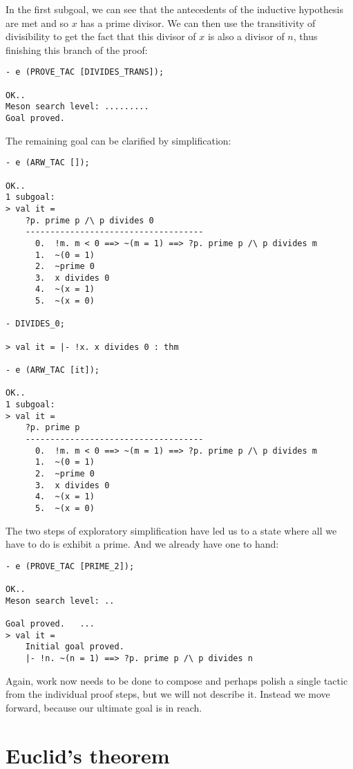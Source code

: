 In the first subgoal, we can see that the antecedents of the inductive
hypothesis are met and so $x$ has a prime divisor. We can then use the
transitivity of divisibility to get the fact that this divisor of $x$ is
also a divisor of $n$, thus finishing this branch of the proof:
\begin{session}\begin{verbatim}
- e (PROVE_TAC [DIVIDES_TRANS]);

OK..
Meson search level: .........
Goal proved.
\end{verbatim}\end{session}
\noindent The remaining goal can be clarified by simplification:
\begin{session}\begin{verbatim}
- e (ARW_TAC []);

OK..
1 subgoal:
> val it =
    ?p. prime p /\ p divides 0
    ------------------------------------
      0.  !m. m < 0 ==> ~(m = 1) ==> ?p. prime p /\ p divides m
      1.  ~(0 = 1)
      2.  ~prime 0
      3.  x divides 0
      4.  ~(x = 1)
      5.  ~(x = 0)

- DIVIDES_0;

> val it = |- !x. x divides 0 : thm

- e (ARW_TAC [it]);

OK..
1 subgoal:
> val it =
    ?p. prime p
    ------------------------------------
      0.  !m. m < 0 ==> ~(m = 1) ==> ?p. prime p /\ p divides m
      1.  ~(0 = 1)
      2.  ~prime 0
      3.  x divides 0
      4.  ~(x = 1)
      5.  ~(x = 0)
\end{verbatim}\end{session}
The two steps of exploratory simplification have led us to a state where
all we have to do is exhibit a prime. And we already have one to hand:
\begin{session}\begin{verbatim}
- e (PROVE_TAC [PRIME_2]);

OK..
Meson search level: ..

Goal proved.   ...
> val it =
    Initial goal proved.
    |- !n. ~(n = 1) ==> ?p. prime p /\ p divides n
\end{verbatim}\end{session}
Again, work now needs to be done to compose and perhaps polish a single
tactic from the individual proof steps, but we will not describe
it. Instead we move forward, because our ultimate goal is in reach.

\section{Euclid's theorem}

